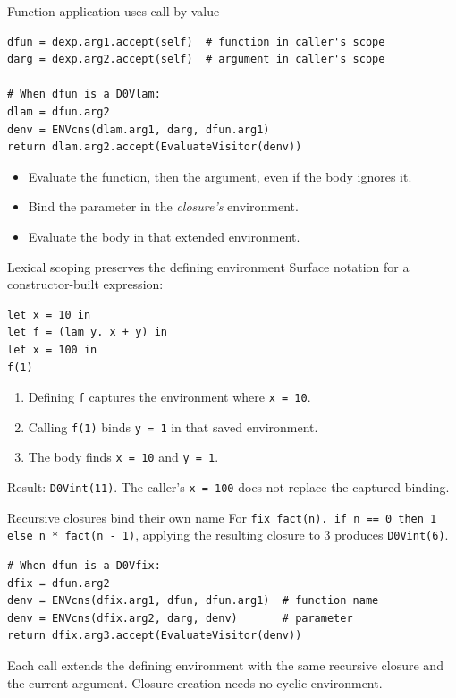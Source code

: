 \documentclass[aspectratio=169,11pt]{beamer}
\newcommand{\code}[1]{\texttt{#1}}
\begin{document}
\begin{frame}[fragile]{Function application uses call by value}
\begin{lstlisting}
dfun = dexp.arg1.accept(self)  # function in caller's scope
darg = dexp.arg2.accept(self)  # argument in caller's scope

# When dfun is a D0Vlam:
dlam = dfun.arg2
denv = ENVcns(dlam.arg1, darg, dfun.arg1)
return dlam.arg2.accept(EvaluateVisitor(denv))
\end{lstlisting}
\begin{itemize}
\item Evaluate the function, then the argument, even if the body ignores it.
\item Bind the parameter in the \emph{closure's} environment.
\item Evaluate the body in that extended environment.
\end{itemize}
\end{frame}

\begin{frame}[fragile]{Lexical scoping preserves the defining environment}
Surface notation for a constructor-built expression:
\begin{lstlisting}
let x = 10 in
let f = (lam y. x + y) in
let x = 100 in
f(1)
\end{lstlisting}
\begin{enumerate}
\item Defining \code{f} captures the environment where \code{x = 10}.
\item Calling \code{f(1)} binds \code{y = 1} in that saved environment.
\item The body finds \code{x = 10} and \code{y = 1}.
\end{enumerate}
\medskip
Result: \alert{\code{D0Vint(11)}}. The caller's \code{x = 100} does not replace the captured binding.
\end{frame}

\begin{frame}[fragile]{Recursive closures bind their own name}
For \code{fix fact(n). if n == 0 then 1 else n * fact(n - 1)},
applying the resulting closure to $3$ produces \code{D0Vint(6)}.
\begin{lstlisting}
# When dfun is a D0Vfix:
dfix = dfun.arg2
denv = ENVcns(dfix.arg1, dfun, dfun.arg1)  # function name
denv = ENVcns(dfix.arg2, darg, denv)       # parameter
return dfix.arg3.accept(EvaluateVisitor(denv))
\end{lstlisting}
Each call extends the defining environment with the same recursive closure
and the current argument. Closure creation needs no cyclic environment.
\end{frame}
\end{document}
